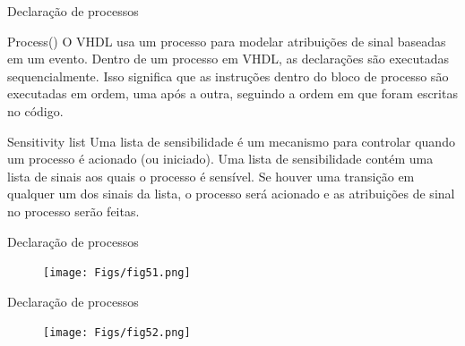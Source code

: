 \documentclass[aspectratio=169]{beamer}
\begin{document}
\begin{frame}{Declaração de processos}
	\justifying
	
	
	\begin{block}{Process()}
	O VHDL usa um processo para modelar atribuições de sinal baseadas em um evento. Dentro de um processo em VHDL, as declarações são executadas sequencialmente. Isso significa que as instruções dentro do bloco de processo são executadas em ordem, uma após a outra, seguindo a ordem em que foram escritas no código.
	\end{block}
	
	
	\begin{block}{Sensitivity list}
	Uma lista de sensibilidade é um mecanismo para controlar quando um processo é acionado (ou iniciado). Uma lista de sensibilidade contém uma lista de sinais aos quais o processo é sensível. Se houver uma transição em qualquer um dos sinais da lista, o processo será acionado e as atribuições de sinal no processo serão feitas. 
	\end{block}	
	
\end{frame}
\begin{frame}{Declaração de processos}
	\justifying
	
	\begin{figure}[h]
	\centering
	\texttt{[image: Figs/fig51.png]}
	\end{figure}
	
	
\end{frame}


\begin{frame}{Declaração de processos}
	\justifying
	
	\begin{figure}[h]
		\centering
		\texttt{[image: Figs/fig52.png]}
	\end{figure}	
	
	
	
\end{frame}

\end{document}
